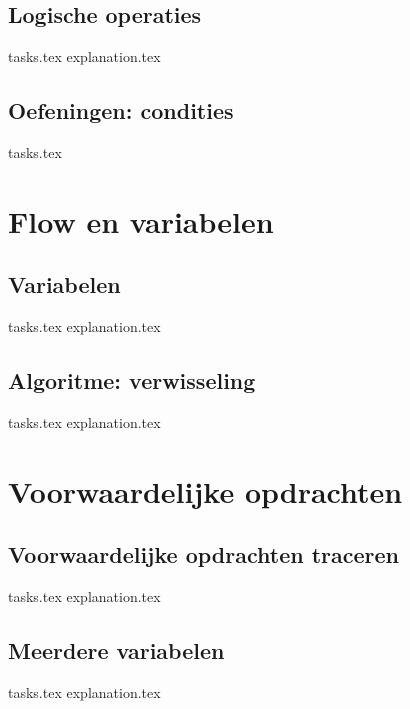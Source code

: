     \section{Logische operaties}
    {tasks.tex}        \newpage
    {explanation.tex}     \newpage

    \section{Oefeningen: condities}
    {tasks.tex}           \newpage \mbox{} \newpage

    \chapter{Flow en variabelen}
    \newpage

    \section{Variabelen}
    {tasks.tex}         \newpage
    {explanation.tex}      \newpage

    \section{Algoritme: verwisseling}
    {tasks.tex}                 \newpage
    {explanation.tex}           \newpage

    \chapter{Voorwaardelijke opdrachten}
    \newpage

    \section{Voorwaardelijke opdrachten traceren}
    {tasks.tex}        \newpage
    {explanation.tex}     \newpage

    \section{Meerdere variabelen}
    {tasks.tex}         \newpage
    {explanation.tex}      \newpage

